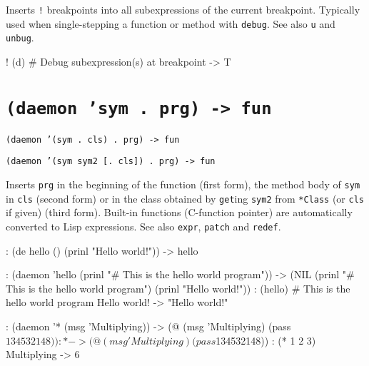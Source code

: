 Inserts \texttt{!} breakpoints into all subexpressions of the current
breakpoint. Typically used when single-stepping a function or method
with \texttt{debug}. See also \texttt{u} and \texttt{unbug}.


\begin{wideverbatim}
! (d)                            # Debug subexpression(s) at breakpoint
-> T
\end{wideverbatim}

 
\section*{\texttt{(daemon 'sym . prg) -> fun}}
\label{sec:func-ref-D-(daemon 'sym . prg) -> fun}


\texttt{(daemon '(sym . cls) . prg) -> fun}

\texttt{(daemon '(sym sym2 [. cls]) . prg) -> fun}

Inserts \texttt{prg} in the beginning of the function (first form),
the method body of \texttt{sym} in \texttt{cls} (second form) or in
the class obtained by \texttt{get}ing \texttt{sym2} from
\texttt{*Class} (or \texttt{cls} if given) (third form). Built-in
functions (C-function pointer) are automatically converted to Lisp
expressions. See also \texttt{expr}, \texttt{patch} and
\texttt{redef}.


\begin{wideverbatim}
: (de hello () (prinl "Hello world!"))
-> hello

: (daemon 'hello (prinl "# This is the hello world program"))
-> (NIL (prinl "# This is the hello world program") (prinl "Hello world!"))
: (hello)
# This is the hello world program
Hello world!
-> "Hello world!"

: (daemon '* (msg 'Multiplying))
-> (@ (msg 'Multiplying) (pass $134532148))
: *
-> (@ (msg 'Multiplying) (pass $134532148))
: (* 1 2 3)
Multiplying
-> 6
\end{wideverbatim}

 
